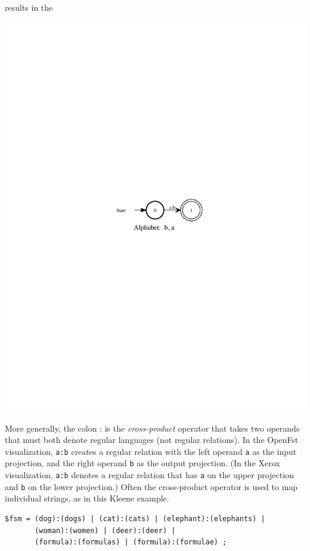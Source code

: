 \noindent
results in the \fst{}


\begin{center}
\includegraphics{images/aoverb.pdf}
\end{center}


\noindent
More generally, the colon : is the \emph{cross-product} operator that takes two operands that must
both denote regular languages (not regular relations).  In the OpenFst
visualization, \texttt{a:b} creates a regular relation with the
left operand \texttt{a} as the input projection, and the right operand
\texttt{b} as the
output projection.  (In the Xerox visualization, \texttt{a:b} denotes a
regular relation that has \texttt{a} on the upper projection and
\texttt{b} on the lower projection.)
Often the cross-product operator is used to map
individual strings, as in this Kleene example.


\begin{Verbatim}
$fsm = (dog):(dogs) | (cat):(cats) | (elephant):(elephants) |
       (woman):(women) | (deer):(deer) |
       (formula):(formulas) | (formula):(formulae) ;
\end{Verbatim}


